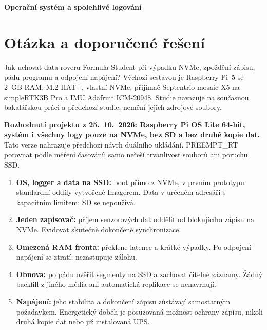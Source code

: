 \documentclass[11pt,a4paper]{article}
\begin{document}
\par\vspace{0.7em}
{\LARGE\bfseries Operační systém a spolehlivé logování\par}
\vspace{0.5em}\par\vspace{0.8em}

\section{Otázka a doporučené řešení}
Jak uchovat data roveru Formula Student při výpadku NVMe, zpoždění zápisu, pádu programu a odpojení napájení? Výchozí sestavou je Raspberry Pi~5 se 2~GB RAM, M.2 HAT+, vlastní NVMe, přijímač Septentrio mosaic-X5 na simpleRTK3B Pro a IMU Adafruit ICM-20948. Studie navazuje na současnou bakalářskou práci a předchozí studie; nemění jejich zdrojové soubory.\cite{projekt}

\textbf{Rozhodnutí projektu z 25.~10.~2026: Raspberry Pi OS Lite 64-bit, systém i všechny logy pouze na NVMe, bez SD a bez druhé kopie dat.} Tato verze nahrazuje předchozí návrh duálního ukládání. PREEMPT\_RT porovnat podle měření časování; samo neřeší trvanlivost souborů ani poruchu SSD.\cite{rpos,rt,fsync}

\begin{enumerate}
\item \textbf{OS, logger a data na SSD:} boot přímo z NVMe, v prvním prototypu standardní oddíly vytvořené Imagerem. Data v určeném adresáři s kapacitním limitem; SD se nepoužívá.
\item \textbf{Jeden zapisovač:} příjem senzorových dat oddělit od blokujícího zápisu na NVMe. Evidovat skutečně dokončené synchronizace.
\item \textbf{Omezená RAM fronta:} překlene latence a krátké výpadky. Po odpojení napájení se ztratí; nezastupuje zálohu.
\item \textbf{Obnova:} po pádu ověřit segmenty na SSD a zachovat čitelné záznamy. Žádný backfill z jiného média ani automatická replikace se nenavrhují.
\item \textbf{Napájení:} jeho stabilita a dokončení zápisu zůstávají samostatným požadavkem. Energetický doběh je posuzovaná možnost ochrany zápisu, nikoli druhá kopie dat nebo již instalovaná UPS.
\end{enumerate}
\end{document}
